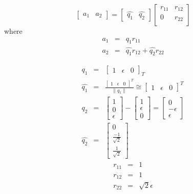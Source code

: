 \documentclass{jhwhw}
\begin{document}
\[
\begin{bmatrix}
  a_1 & a_2
\end{bmatrix}
=
\begin{bmatrix}
  \hat{q_1} & \hat{q_2}
\end{bmatrix}
\begin{bmatrix}
  r_{11} & r_{12} \\
  0      & r_{22} \\
\end{bmatrix}
\]
where
\begin{eqnarray*}
  a_1 &=& q_1r_{11} \\
  a_2 &=& \hat{q_1}r_{12} + \hat{q_2}r_{22}
\end{eqnarray*}

\begin{eqnarray*}
  q_1 &=&
  \begin{bmatrix}
	1 &
	\epsilon &
	0
  \end{bmatrix}_T \\
\hat{q_1} &=&
\frac{\begin{bmatrix}
  1 &
  \epsilon &
  0
\end{bmatrix}^T}{\|q_1\|}
\cong
\begin{bmatrix}
  1 &
  \epsilon &
  0
\end{bmatrix}^T \\
  q_2 &=&
  \begin{bmatrix}
	1 \\
	0  \\
	\epsilon
  \end{bmatrix}
  -
  \begin{bmatrix}
	1 \\
	\epsilon \\
	0
  \end{bmatrix}
  =
  \begin{bmatrix}
	0 \\
	-\epsilon \\
	\epsilon
  \end{bmatrix} \\
\hat{q_2} &=&
\begin{bmatrix}
  0 \\[6pt]
  \frac{-1}{\sqrt{2}} \\[6pt]
  \frac{1}{\sqrt{2}} 
\end{bmatrix}
\end{eqnarray*}
\begin{eqnarray*}
  r_{11} &=& 1 \\
  r_{12} &=& 1 \\
  r_{22} &=& \sqrt{2}\epsilon
\end{eqnarray*}
\end{document}
